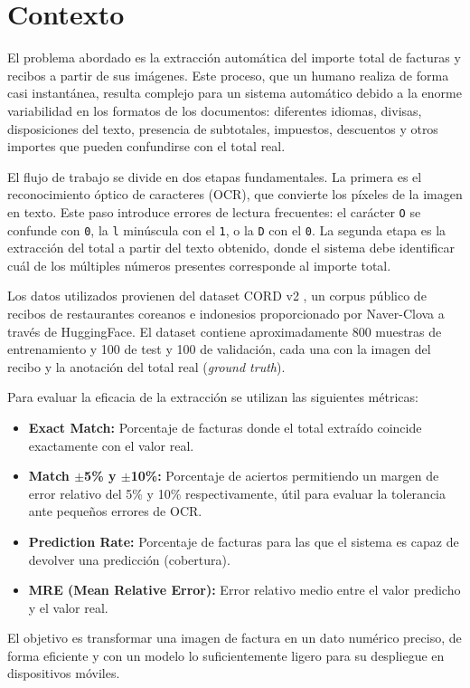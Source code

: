 \section{Contexto}
\label{sec:contexto}

El problema abordado es la extracción automática del importe total de facturas y recibos a partir de sus imágenes. Este proceso, que un humano realiza de forma casi instantánea, resulta complejo para un sistema automático debido a la enorme variabilidad en los formatos de los documentos: diferentes idiomas, divisas, disposiciones del texto, presencia de subtotales, impuestos, descuentos y otros importes que pueden confundirse con el total real.

El flujo de trabajo se divide en dos etapas fundamentales. La primera es el reconocimiento óptico de caracteres (OCR), que convierte los píxeles de la imagen en texto. Este paso introduce errores de lectura frecuentes: el carácter \texttt{O} se confunde con \texttt{0}, la \texttt{l} minúscula con el \texttt{1}, o la \texttt{D} con el \texttt{0}. La segunda etapa es la extracción del total a partir del texto obtenido, donde el sistema debe identificar cuál de los múltiples números presentes corresponde al importe total.

Los datos utilizados provienen del dataset CORD v2 \cite{avidan2022computer}, un corpus público de recibos de restaurantes coreanos e indonesios proporcionado por Naver-Clova a través de HuggingFace. El dataset contiene aproximadamente 800 muestras de entrenamiento y 100 de test y 100 de validación, cada una con la imagen del recibo y la anotación del total real (\textit{ground truth}).

Para evaluar la eficacia de la extracción se utilizan las siguientes métricas:

\begin{itemize}
    \item \textbf{Exact Match:} Porcentaje de facturas donde el total extraído coincide exactamente con el valor real.
    \item \textbf{Match $\pm$5\% y $\pm$10\%:} Porcentaje de aciertos permitiendo un margen de error relativo del 5\% y 10\% respectivamente, útil para evaluar la tolerancia ante pequeños errores de OCR.
    \item \textbf{Prediction Rate:} Porcentaje de facturas para las que el sistema es capaz de devolver una predicción (cobertura).
    \item \textbf{MRE (Mean Relative Error):} Error relativo medio entre el valor predicho y el valor real.
\end{itemize}

El objetivo es transformar una imagen de factura en un dato numérico preciso, de forma eficiente y con un modelo lo suficientemente ligero para su despliegue en dispositivos móviles.
